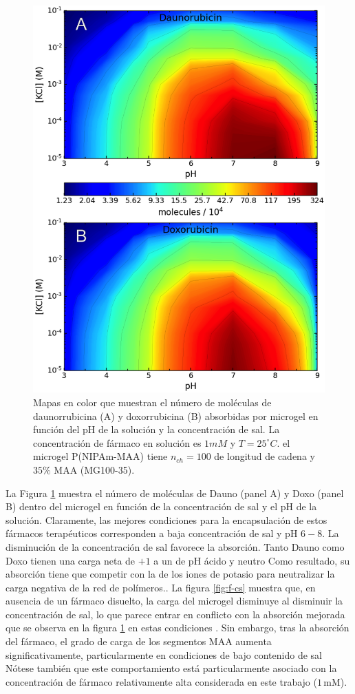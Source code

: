 \begin{figure}[!tb]
	\centering
	\includegraphics[width=0.55\linewidth]{Figures/graph-gel/drug_ads.png}
	\caption{Mapas en color que muestran el n\'umero de mol\'eculas de daunorrubicina (A) y doxorrubicina (B) absorbidas por microgel en funci\'on del pH de la soluci\'on y la concentraci\'on de sal.
		La concentraci\'on de f\'armaco en soluci\'on es $1mM$ y $T=25 ^\circ C$.
		el microgel P(NIPAm-MAA) tiene $n_{ch}=100$ de longitud de cadena y $35\%$ MAA (MG100-35).}
	\label{fig:drug_ads}
\end{figure}



La Figura \ref{fig:drug_ads} muestra el n\'umero de mol\'eculas de Dauno (panel A) y Doxo (panel B) dentro del microgel en funci\'on de la concentraci\'on de sal y el pH de la soluci\'on.
Claramente, las mejores condiciones para la encapsulaci\'on de estos f\'armacos terap\'euticos corresponden a baja concentraci\'on de sal y pH $6-8$.
La disminución de la concentraci\'on de sal favorece la absorci\'on.
Tanto Dauno como Doxo tienen una carga neta de $+1$ a un  de pH \'acido y neutro %
Como resultado, su absorci\'on tiene que competir con la de los iones de potasio para neutralizar la carga negativa de la red de pol\'imeros.\addcite[PerezChavez2020].
La figura \ref{fig:f-cs} muestra que, en ausencia de un f\'armaco disuelto, la carga del microgel disminuye al disminuir la concentraci\'on de sal, lo que parece entrar en conflicto con la absorci\'on mejorada que se observa en la figura \ref{fig:drug_ads} en estas condiciones .
Sin embargo, tras la absorci\'on del f\'armaco, el grado de carga de los segmentos MAA aumenta significativamente, particularmente en condiciones de bajo contenido de sal %
N\'otese tambi\'en que este comportamiento est\'a particularmente asociado con la concentraci\'on de f\'armaco relativamente alta considerada en este trabajo ($1\,$mM).

